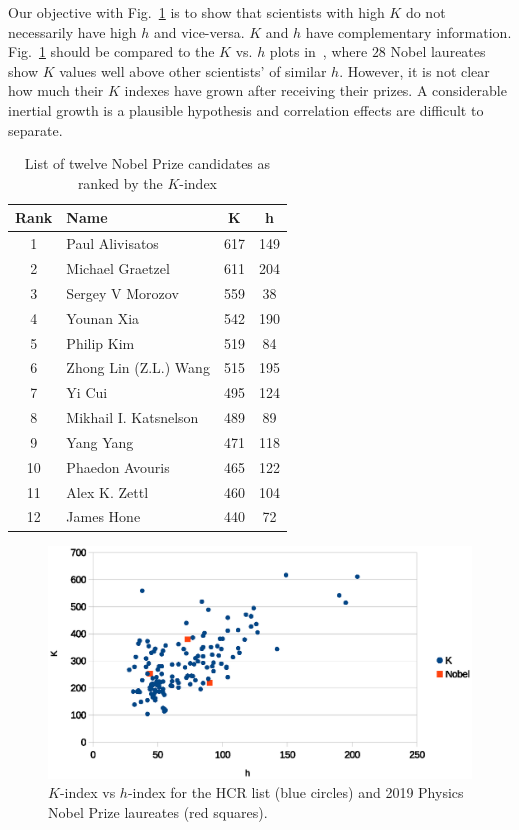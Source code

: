 \documentclass[final,3p,times]{elsarticle}
\begin{document}
Our objective with Fig.~\ref{fig1} is to show that scientists 
with high $K$ do not necessarily have high
$h$ and vice-versa. $K$ and $h$ have complementary information.
Fig.~\ref{fig1}  should  be compared to the $K$ vs. $h$ plots
in~\cite{kinouchi2018,kinouchi2018k}, where $28$
Nobel laureates  show  $K$ values well above other scientists' 
of similar $h$. However, it is not clear how much their $K$ indexes
have grown after receiving their prizes. A considerable inertial growth is a plausible hypothesis and correlation effects are difficult to
separate.

\begin{table}[ht]
\centering
\begin{tabular}{c l c c}
\hline
\textbf{Rank}   &\textbf{Name} & \textbf{K} & \textbf{h}\\ \hline
 1 & Paul Alivisatos         & 617    & 149 \\
 2 & Michael Graetzel        & 611    & 204 \\ 
 3 & Sergey V Morozov        & 559    &  38 \\
 4 & Younan Xia              & 542    & 190 \\
 5 & Philip Kim              & 519    & 84 \\
 6 & Zhong Lin (Z.L.) Wang   & 515    & 195 \\
 7 & Yi Cui                  & 495    & 124 \\
 8 & Mikhail I. Katsnelson   & 489    & 89 \\
 9 & Yang Yang               & 471    & 118 \\
10 & Phaedon Avouris         & 465    & 122 \\
11 & Alex K. Zettl           & 460    & 104 \\
12 & James Hone              & 440    & 72  \\
\hline\end{tabular}
\caption{List of twelve Nobel Prize candidates as ranked by the $K$-index}
\end{table}

\begin{figure}[ht]
\begin{center}
\includegraphics[width=0.9\linewidth]{figure1.eps}
\end{center}
\caption{ $K$-index vs $h$-index for the HCR list (blue circles)
and 2019 Physics Nobel Prize laureates (red squares).}
\label{fig1}
\end{figure}
\end{document}
